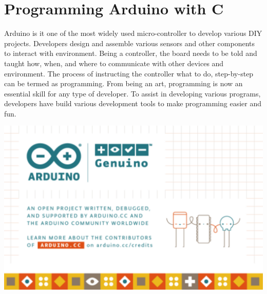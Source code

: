 \chapter{Programming Arduino with C}
\par Arduino is it one of the most widely used micro-controller to develop various DIY projects. Developers design and assemble various sensors and other components to interact with environment. Being a controller, the board needs to be told and taught how, when, and where to communicate with other devices and environment. The process of instructing the controller what to do, step-by-step can be termed as programming. From being an art, programming is now an essential skill for any type of developer. To assist in developing various programs, developers have build various development tools to make programming easier and fun. 
\begin{marginfigure}
    \vspace{-4cm}  \includegraphics{Images/Programing_Arduino/IDE_startup.png}
\end{marginfigure}

